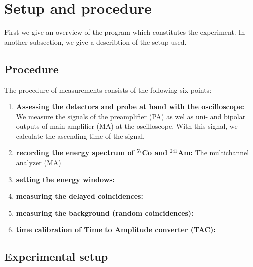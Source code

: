 \section{Setup and procedure}
First we give an overview of the program which constitutes the experiment. In another subsection, 
we give a describtion of the setup used. 
\subsection{Procedure}
The procedure of measurements consists of the following six points:
\begin{enumerate}
    \item 
        \textbf{Assessing the detectors and probe at hand with the oscilloscope:}
        We measure the signals of the preamplifier (PA) as wel as uni- and bipolar outputs of 
        main amplifier (MA) at the oscilloscope. With this signal, we calculate the ascending time 
        of the signal.
    \item 
        \textbf{recording the energy spectrum of $^{57}$Co and $^{241}$Am:}
        The multichannel analyzer (MA)
        
    \item
        \textbf{setting the energy windows:}
    \item
        \textbf{measuring the delayed coincidences:}
    \item
        \textbf{measuring the background (random coincidences):}
    \item
        \textbf{time calibration of Time to Amplitude converter (TAC):}
\end{enumerate}






\subsection{Experimental setup}


